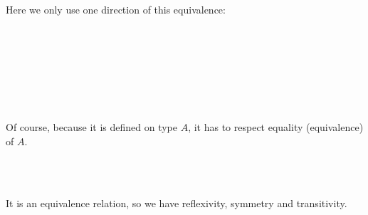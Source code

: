 Here we only use one direction of this equivalence:

\begin{code}
%
\\
\>[0]\<[9]%
\>[9] \AgdaSymbol{:}   \AgdaSymbol{:}   \AgdaSymbol{\}}\<%
\\
\>[9]\<[19]%
\>[19]\AgdaSymbol{(} \AgdaSymbol{:} \AgdaFunction{[}  \AgdaFunction{]}   \AgdaSymbol{)}\<%
\\
\>[9]\<[19]%
\>[19]\AgdaSymbol{(}  \AgdaSymbol{:}  \AgdaFunction{[}  \AgdaFunction{]fm}  \AgdaSymbol{)} \<%
\\
\>[9]\<[19]%
\>[19]   \AgdaSymbol{)}  \<[32]%
\>[32]\<%
\\
\>[9]\<[19]%
\>[19]  \AgdaSymbol{(}\AgdaFunction{[}  \AgdaFunction{]subst}  \AgdaSymbol{)} \AgdaSymbol{(}\AgdaFunction{[}  \AgdaFunction{]subst}  \AgdaSymbol{))}\<%
\\
\end{code}

Of course, because it is defined on type $A$, it has to respect equality (equivalence) of $A$.

\begin{code}
%
\\
\>[0]\<[9]%
\>[9] \AgdaSymbol{:}  \AgdaSymbol{\{}  \AgdaSymbol{\}}  \AgdaFunction{[} \AgdaFunction{[}  \AgdaFunction{]fm}  \AgdaFunction{]}   \AgdaSymbol{)}     \AgdaSymbol{)}\<%
\\
\end{code}

It is an equivalence relation, so we have reflexivity, symmetry and transitivity.

